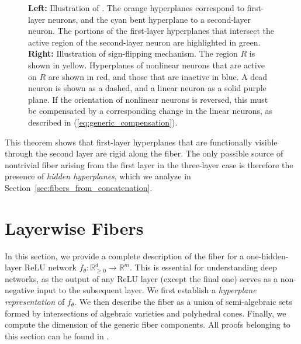 \documentclass{article}
\theoremstyle{definition}
\newcommand{\R}{\mathbb{R}}
\begin{document}
\begin{figure}
\begin{subfigure}{0.3\textwidth}
\end{subfigure}

\caption{\textbf{Left:} Illustration of . 
    The orange hyperplanes correspond to first-layer neurons, and the cyan bent hyperplane to a second-layer neuron. 
    The portions of the first-layer hyperplanes that intersect the active region of the second-layer neuron are highlighted in green. \textbf{Right:}
 Illustration of sign-flipping mechanism. 
    The region $R$ is shown in yellow. Hyperplanes of nonlinear neurons that are active on $R$ are shown in red, and those that are inactive in blue. A dead neuron is shown as a dashed,  and a linear neuron as a solid purple plane. 
    If the orientation of nonlinear neurons is reversed, this must be compensated by a corresponding change in the linear neurons, as described in (\ref{eq:generic_compensation}). 
    }
    \label{fig:intersected_hyperplanes}
    \label{fig:sign_flip}
\end{figure}

This theorem shows that first-layer hyperplanes that are functionally visible through the second layer
are rigid along the fiber. The only possible source of nontrivial fiber arising from the first layer in the three-layer
case is therefore the presence of \emph{hidden hyperplanes}, which we analyze in
Section~\ref{sec:fibers_from_concatenation}.


\section{Layerwise Fibers}
\label{sec:layerwise_fibers}

In this section, we provide a complete description of the fiber for a one-hidden-layer ReLU network $f_\theta \colon \R_{\ge 0}^d \to \R^m$. 
This is essential for understanding deep networks, as the output of any ReLU layer (except the final one) serves as a non-negative input to the subsequent layer. 
We first establish a \emph{hyperplane  representation} of $f_\theta$. 
%
We then describe the fiber as a union of semi-algebraic sets formed by intersections of algebraic varieties and polyhedral cones. 
Finally, we compute the dimension of the generic fiber components. 
All proofs belonging to this section can be found in . 
\end{document}
